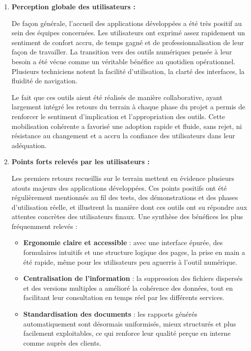 \documentclass[11pt,a4paper]{article}
\begin{document}
\begin{enumerate}
\item \textbf{Perception globale des utilisateurs :}

De façon générale, l’accueil des applications développées a été très positif au sein des équipes concernées. Les utilisateurs ont exprimé assez rapidement un sentiment de confort accru, de temps gagné et de professionnalisation de leur façon de travailler. La transition vers des outils numériques pensée à leur besoin a été vécue comme un véritable bénéfice au quotidien opérationnel. Plusieurs techniciens notent la facilité d’utilisation, la clarté des interfaces, la fluidité de navigation. 

Le fait que ces outils aient été réalisés de manière collaborative, ayant largement intégré les retours du terrain à chaque phase du projet a permis de renforcer le sentiment d’implication et l’appropriation des outils. Cette mobilisation cohérente a favorisé une adoption rapide et fluide, sans rejet, ni résistance au changement et a accru la confiance des utilisateurs dans leur adéquation.

\item \textbf{Points forts relevés par les utilisateurs :}

Les premiers retours recueillis sur le terrain mettent en évidence plusieurs atouts majeurs des applications développées. Ces points positifs ont été régulièrement mentionnés au fil des tests, des démonstrations et des phases d’utilisation réelle, et illustrent la manière dont ces outils ont su répondre aux attentes concrètes des utilisateurs finaux. Une synthèse des bénéfices les plus fréquemment relevés :

\begin{itemize}
    \item \textbf{Ergonomie claire et accessible} : avec une interface épurée, des formulaires intuitifs et une structure logique des pages, la prise en main a été rapide, même pour les utilisateurs peu aguerris à l’outil numérique.
    
    \item \textbf{Centralisation de l’information} : la suppression des fichiers dispersés et des versions multiples a amélioré la cohérence des données, tout en facilitant leur consultation en temps réel par les différents services.
    
    \item \textbf{Standardisation des documents} : les rapports générés automatiquement sont désormais uniformisés, mieux structurés et plus facilement exploitables, ce qui renforce leur qualité perçue en interne comme auprès des clients.
    

\end{itemize}
\end{enumerate}
\end{document}

